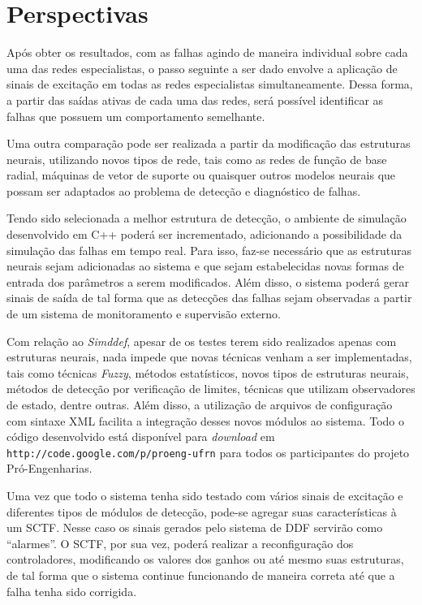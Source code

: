 \section{Perspectivas}
Após obter os resultados, com as falhas agindo de maneira individual sobre cada
uma das redes especialistas, o passo seguinte a ser dado envolve a aplicação de
sinais de excitação em todas as redes especialistas simultaneamente. Dessa
forma, a partir das saídas ativas de cada uma das redes, será possível
identificar as falhas que possuem um comportamento semelhante. 
 
Uma outra comparação pode ser realizada a partir da modificação das estruturas
neurais, utilizando novos tipos de rede, tais como as redes de função de base
radial, máquinas de vetor de suporte ou quaisquer outros modelos neurais que
possam ser adaptados ao problema de detecção e diagnóstico de falhas.

Tendo sido selecionada a melhor estrutura de detecção, o ambiente de simulação
desenvolvido em C++ poderá ser incrementado, adicionando a possibilidade da
simulação das falhas em tempo real. Para isso, faz-se necessário que as
estruturas neurais sejam adicionadas ao sistema e que sejam estabelecidas novas
formas de entrada dos parâmetros a serem modificados. Além disso, o sistema
poderá gerar sinais de saída de tal forma que as detecções das falhas sejam
observadas a partir de um sistema de monitoramento e supervisão externo. 

Com relação ao {\it Simddef}, apesar de os testes terem sido realizados apenas
com estruturas neurais, nada impede que novas técnicas venham a ser
implementadas, tais como técnicas {\it Fuzzy}, métodos estatísticos, novos tipos
de estruturas neurais, métodos de detecção por verificação de limites, técnicas
que utilizam observadores de estado, dentre outras. Além disso, a utilização de
arquivos de configuração com sintaxe XML facilita a integração desses novos
módulos ao sistema. Todo o código desenvolvido está disponível para {\it
download} em {\tt http://code.google.com/p/proeng-ufrn} para todos os
participantes do projeto Pró-Engenharias.

Uma vez que todo o sistema tenha sido testado com vários sinais de excitação e
diferentes tipos de módulos de detecção, pode-se agregar suas características à
um SCTF. Nesse caso os sinais gerados pelo sistema de DDF servirão como
``alarmes''. O SCTF, por sua vez, poderá realizar a reconfiguração dos
controladores, modificando os valores dos ganhos ou até mesmo suas estruturas,
de tal forma que o sistema continue funcionando de maneira correta até que a
falha tenha sido corrigida.
